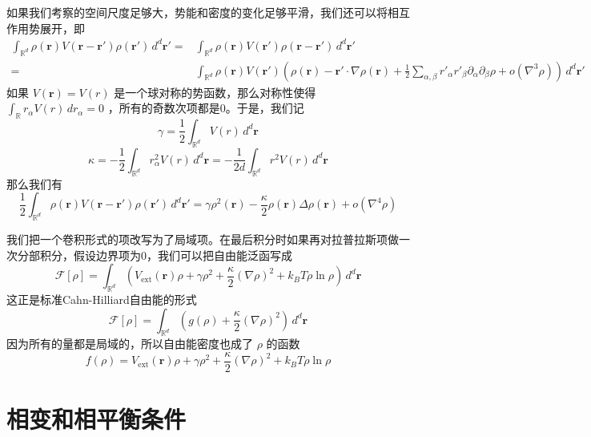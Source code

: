 \documentclass{ctexart}
\begin{document}
如果我们考察的空间尺度足够大，势能和密度的变化足够平滑，我们还可以将相互作用势展开，即
\begin{align} \int_{\mathbb{R}^d}\rho(\bm{r}) V(\bm{r}-\bm{r}')\rho(\bm{r}')\,d^d\bm{r}'=&\int_{\mathbb{R}^d}\rho(\bm{r}) V(\bm{r}')\rho(\bm{r}-\bm{r}')\,d^d\bm{r}' \\ =&\int_{\mathbb{R}^d}\rho(\bm{r}) V(\bm{r}')\left(\rho(\bm{r})-\bm{r'}\cdot\nabla\rho(\bm{r})+\frac{1}{2}\sum_{\alpha,\beta}r'_\alpha r'_\beta\partial_\alpha\partial_\beta\rho+o(\nabla^3\rho)\right)\,d^d\bm{r}' \end{align}
如果 $V(\bm{r})=V(r)$ 是一个球对称的势函数，那么对称性使得 $\int_\mathbb{R} r_\alpha V(r)\,dr_\alpha=0$ ，所有的奇数次项都是0。于是，我们记
\begin{equation}
\gamma=\frac{1}{2}\int_{\mathbb{R}^d}V(r)\,d^d\bm{r}
\end{equation}
\begin{equation}
\kappa=-\frac{1}{2}\int_{\mathbb{R}^d} r_\alpha^2V(r)\,d^d\bm{r}=-\frac{1}{2d}\int_{\mathbb{R}^d} r^2V(r)\,d^d\bm{r}
\end{equation}
那么我们有
\begin{equation}
\frac{1}{2}\int_{\mathbb{R}^d}\rho(\bm{r}) V(\bm{r}-\bm{r}')\rho(\bm{r}')\,d^d\bm{r}'=\gamma\rho^2(\bm{r})-\frac{\kappa}{2}\rho(\bm{r})\Delta\rho(\bm{r})+o(\nabla^4\rho)
\end{equation}

我们把一个卷积形式的项改写为了局域项。在最后积分时如果再对拉普拉斯项做一次分部积分，假设边界项为0，我们可以把自由能泛函写成
\begin{equation}
\mathcal{F}[\rho]=\int_{\mathbb{R}^d}\left(V_{\mathrm{ext}}(\bm{r})\rho+\gamma\rho^2+\frac{\kappa}{2}(\nabla\rho)^2+k_BT\rho\ln\rho\right)\,d^d\bm{r}
\end{equation}
这正是标准Cahn-Hilliard自由能的形式
\begin{equation}
\mathcal{F}[\rho]=\int_{\mathbb{R}^d}\left(g(\rho)+\frac{\kappa}{2}(\nabla\rho)^2\right)\,d^d\bm{r}
\end{equation}
因为所有的量都是局域的，所以自由能密度也成了 $\rho$ 的函数
\begin{equation}
f(\rho)=V_{\mathrm{ext}}(\bm{r})\rho+\gamma\rho^2+\frac{\kappa}{2}(\nabla\rho)^2+k_BT\rho\ln\rho
\end{equation}

\section{相变和相平衡条件}
\end{document}
